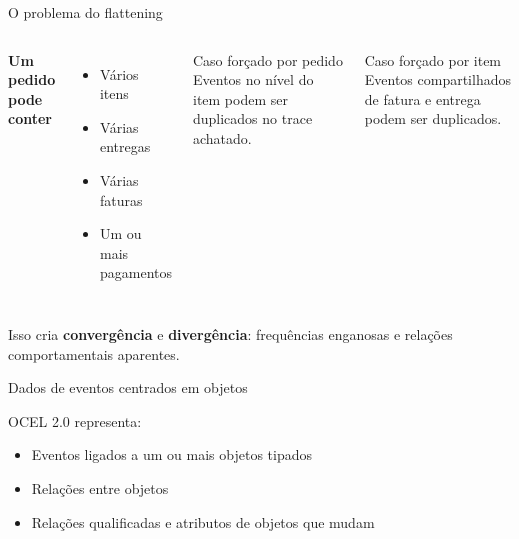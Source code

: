 \documentclass[aspectratio=169,11pt]{beamer}
\begin{document}
\begin{frame}{O problema do flattening}
  \begin{columns}[T,onlytextwidth]
      \textbf{Um pedido pode conter}
      \begin{itemize}
        \item Vários itens
        \item Várias entregas
        \item Várias faturas
        \item Um ou mais pagamentos
      \end{itemize}
      \begin{block}{Caso forçado por pedido}
        Eventos no nível do item podem ser duplicados no trace achatado.
      \end{block}
      \begin{block}{Caso forçado por item}
        Eventos compartilhados de fatura e entrega podem ser duplicados.
      \end{block}
  \end{columns}
  \vspace{0.4cm}
  Isso cria \textbf{convergência} e \textbf{divergência}: frequências enganosas e relações comportamentais aparentes.
\end{frame}

\begin{frame}{Dados de eventos centrados em objetos}
  \centering
  \vspace{0.55cm}
  OCEL 2.0 representa:
  \begin{itemize}
    \item Eventos ligados a um ou mais objetos tipados
    \item Relações entre objetos
    \item Relações qualificadas e atributos de objetos que mudam
  \end{itemize}
\end{frame}
\end{document}
